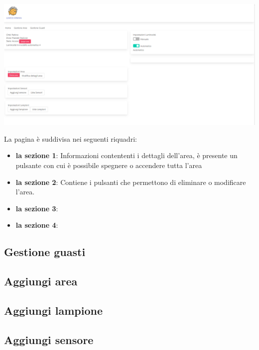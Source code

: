 \documentclass[9pt]{article}
\begin{document}
\begin{center}
	\includegraphics[scale=0.3]{Area.png}
\end{center}	

La pagina è suddivisa nei seguenti riquadri:
\begin{itemize}
	\item \textbf{la sezione 1}: Informazioni contententi i dettagli dell'area, è presente un pulsante con cui è possibile spegnere o accendere tutta l'area
	\item \textbf{la sezione 2}: Contiene i pulsanti che permettono di eliminare o modificare l'area.
	\item \textbf{la sezione 3}: 
	\item \textbf{la sezione 4}: 
\end{itemize}
\subsection{Gestione guasti}

\subsection{Aggiungi area}
\subsection{Aggiungi lampione}
\subsection{Aggiungi sensore}
\end{document}
